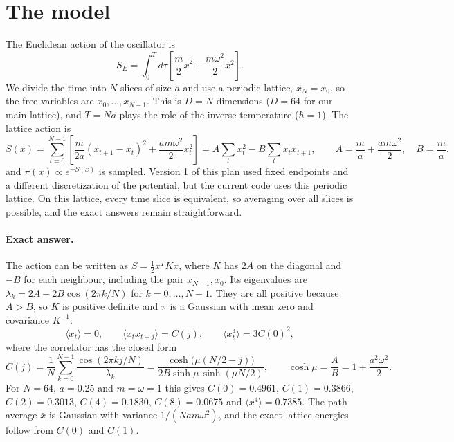 \documentclass[11pt]{article}
\begin{document}
\section{The model}
The Euclidean action of the oscillator is
\begin{equation}
  S_E = \int_0^{T} d\tau \left[ \frac{m}{2}\dot x^2 + \frac{m\omega^2}{2}x^2 \right].
\end{equation}
We divide the time into $N$ slices of size $a$ and use a periodic lattice, $x_N = x_0$, so the free variables are $x_0, \dots, x_{N-1}$. This is $D = N$ dimensions ($D = 64$ for our main lattice), and $T = Na$ plays the role of the inverse temperature ($\hbar = 1$). The lattice action is
\begin{equation}
  S(x) = \sum_{t=0}^{N-1}\left[\frac{m}{2a}(x_{t+1}-x_t)^2 + \frac{am\omega^2}{2}x_t^2\right]
       = A\sum_t x_t^2 - B\sum_t x_t x_{t+1},
  \qquad A = \frac{m}{a} + \frac{am\omega^2}{2},\quad B = \frac{m}{a},
  \label{eq:action}
\end{equation}
and $\pi(x) \propto e^{-S(x)}$ is sampled. Version 1 of this plan used fixed endpoints and a different discretization of the potential, but the current code uses this periodic lattice. On this lattice, every time slice is equivalent, so averaging over all slices is possible, and the exact answers remain straightforward.

\paragraph{Exact answer.} The action can be written as $S = \frac12 x^T K x$, where $K$ has $2A$ on the diagonal and $-B$ for each neighbour, including the pair $x_{N-1}, x_0$. Its eigenvalues are $\lambda_k = 2A - 2B\cos(2\pi k/N)$ for $k = 0, \dots, N-1$. They are all positive because $A > B$, so $K$ is positive definite and $\pi$ is a Gaussian with mean zero and covariance $K^{-1}$:
\begin{equation}
  \langle x_t\rangle = 0, \qquad \langle x_t x_{t+j}\rangle = C(j), \qquad \langle x_t^4\rangle = 3C(0)^2,
  \label{eq:exact}
\end{equation}
where the correlator has the closed form
\begin{equation}
  C(j) = \frac{1}{N}\sum_{k=0}^{N-1}\frac{\cos(2\pi kj/N)}{\lambda_k}
       = \frac{\cosh\big(\mu(N/2-j)\big)}{2B\sinh\mu\,\sinh(\mu N/2)},
  \qquad \cosh\mu = \frac{A}{B} = 1 + \frac{a^2\omega^2}{2}.
  \label{eq:corr}
\end{equation}
For $N = 64$, $a = 0.25$ and $m = \omega = 1$ this gives $C(0) = 0.4961$, $C(1) = 0.3866$, $C(2) = 0.3013$, $C(4) = 0.1830$, $C(8) = 0.0675$ and $\langle x^4\rangle = 0.7385$. The path average $\bar x$ is Gaussian with variance $1/(Nam\omega^2)$, and the exact lattice energies follow from $C(0)$ and $C(1)$.
\end{document}
